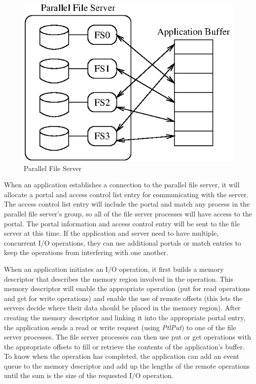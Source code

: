 \documentclass{sand-report}
\begin{document}
\begin{figure}[htbp]
\centerline{\includegraphics{file.eps}}
\caption{Parallel File Server}
\label{fig:file}
\end{figure}

When an application establishes a connection to the parallel file
server, it will allocate a portal and access control list entry for
communicating with the server.  The access control list entry will
include the portal and match any process in the parallel file server's
group, so all of the file server processes will have access to the
portal.  The portal information and access control entry will be sent
to the file server at this time.  If the application and server need
to have multiple, concurrent I/O operations, they can use additional
portals or match entries to keep the operations from interfering with
one another.

When an application initiates an I/O operation, it first builds a
memory descriptor that describes the memory region involved in the
operation.  This memory descriptor will enable the appropriate
operation (put for read operations and get for write operations) and
enable the use of remote offsets (this lets the servers decide where
their data should be placed in the memory region).  After creating the
memory descriptor and linking it into the appropriate portal entry,
the application sends a read or write request (using \emph{PtlPut}) to
one of the file server processes.  The file server processes can then
use put or get operations with the appropriate offsets to fill or
retrieve the contents of the application's buffer.  To know when the
operation has completed, the application can add an event queue to the
memory descriptor and add up the lengths of the remote operations
until the sum is the size of the requested I/O operation.
\end{document}
